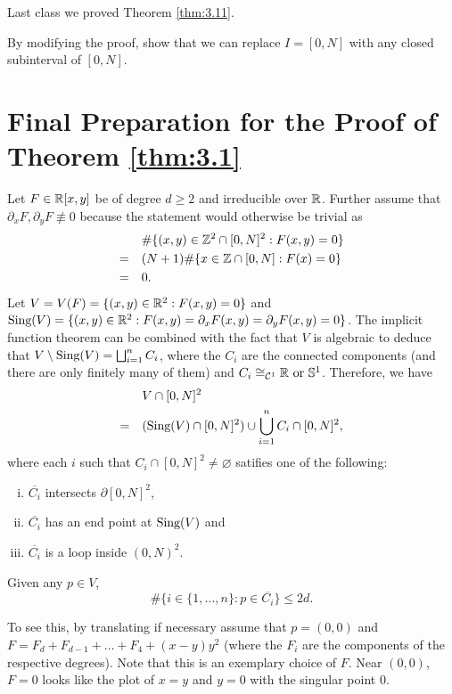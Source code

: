 \documentclass{Vorlesungstemplate_English} %
\begin{document}
Last class we proved Theorem \ref{thm:3.11}.
\begin{exercise}{}{}
  By modifying the proof, show that we can replace $I= [0, N]$ with any closed subinterval of $[0,N]$.
\end{exercise}
\section{Final Preparation for the Proof of Theorem \ref{thm:3.1}}
Let $F \in \mathbb{R}[x,y]$ be of degree $d \geq 2$ and irreducible over $\mathbb{R}$. Further assume that $\partial_xF, \partial_yF \not\equiv 0$ because the statement would otherwise be trivial as
\begin{align*} & \#\{ (x,y) \in \mathbb{Z}^2 \cap [0,N]^2: F(x,y)=0\} \\
= \quad & (N+1)\#\{ x \in \mathbb{Z} \cap [0,N]: F(x) = 0\} \\
= \quad & 0.\end{align*}
Let $V = V(F) = \{ (x,y) \in \mathbb{R}^2: F(x,y)=0\}$ and $\text{Sing}(V) = \{ (x,y) \in \mathbb{R}^2: F(x,y) = \partial_xF(x,y) = \partial_yF(x,y) = 0\}$. The implicit function theorem can be combined with the fact that $V$ is algebraic to deduce that $V \setminus \text{Sing}(V) = \bigsqcup_{i=1}^n C_i$, where the $C_i$ are the connected components (and there are only finitely many of them) and $C_i \cong_{\mathcal{C}^1} \mathbb{R} \text{ or } \mathbb{S}^1$. Therefore, we have
\begin{align*}
  & V \cap [0,N]^2 \\
  = \quad & (\text{Sing}(V) \cap [0,N]^2) \cup \bigcup_{i=1}^n C_i \cap [0,N]^2,
\end{align*}
where each $i$ such that $C_i \cap [0,N]^2 \neq \varnothing$ satifies one of the following:
\begin{enumerate}[(i)]
  \item $\overline{C_i}$ intersects $\partial[0,N]^2$,
  \item $\overline{C_i}$ has an end point at $\text{Sing}(V)$ and
  \item $\overline{C_i}$ is a loop inside $(0,N)^2$.
\end{enumerate}
\begin{fact}{}{}
  Given any $p \in V$,
  \[ \#\{ i \in \{ 1, \dots, n\}: p \in \overline{C_i}\} \leq 2d.\]
\end{fact}
\begin{pf}
  To see this, by translating if necessary assume that $p = (0,0)$ and $F = F_d + F_{d-1} + \dots + F_4 + (x-y)y^2$ (where the $F_i$ are the components of the respective degrees). {\color{blue} Note that this is an exemplary choice of $F$.} Near $(0,0)$, $F=0$ looks like the plot of $x=y$ and $y=0$ with the singular point $0$.
\end{pf}
\end{document}
